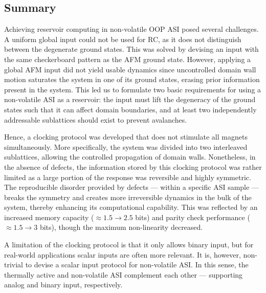 \subsection{Summary}
Achieving reservoir computing in non-volatile OOP ASI posed several challenges.
A uniform global input could not be used for RC, as it does not distinguish between the degenerate ground states.
This was solved by devising an input with the same checkerboard pattern as the AFM ground state.
However, applying a global AFM input did not yield usable dynamics since uncontrolled domain wall motion saturates the system in one of its ground states, erasing prior information present in the system.
This led us to formulate two basic requirements for using a non-volatile ASI as a reservoir: the input must lift the degeneracy of the ground states such that it can affect domain boundaries, and at least two independently addressable sublattices should exist to prevent avalanches. \par
Hence, a clocking protocol was developed that does not stimulate all magnets simultaneously.
More specifically, the system was divided into two interleaved sublattices, allowing the controlled propagation of domain walls.
Nonetheless, in the absence of defects, the information stored by this clocking protocol was rather limited as a large portion of the response was reversible and highly symmetric.
The reproducible disorder provided by defects --- within a specific ASI sample --- breaks the symmetry and creates more irreversible dynamics in the bulk of the system, thereby enhancing its computational capability.
This was reflected by an increased memory capacity ($\approx 1.5 \rightarrow 2.5$ bits) and parity check performance ($\approx 1.5 \rightarrow 3$ bits), though the maximum non-linearity decreased. \par
A limitation of the clocking protocol is that it only allows binary input, but for real-world applications scalar inputs are often more relevant.
It is, however, non-trivial to devise a scalar input protocol for non-volatile ASI.
In this sense, the thermally active and non-volatile ASI complement each other --- supporting analog and binary input, respectively.


